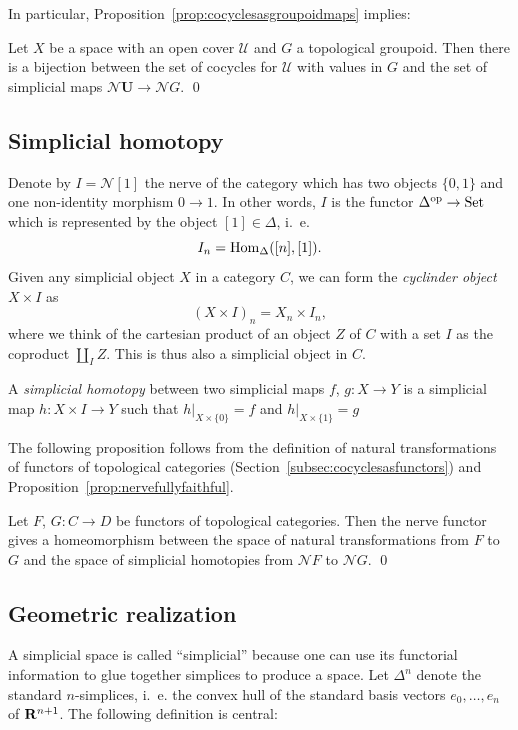 \documentclass[a4paper,openany]{scrbook}
\newcommand{\nerve}{\mathcal N}
\begin{document}
In particular, Proposition~\ref{prop:cocyclesasgroupoidmaps} implies:

\begin{corollary}
Let $X$ be a space with an open cover $\mathcal U$ and $G$ a topological groupoid. Then there is a bijection between the set of cocycles for $\mathcal U$ with values in $G$ and the set of simplicial maps $\nerve \mathbf U \to \nerve G$. \qed
\end{corollary}

\subsection{Simplicial homotopy}

Denote by $I=\nerve [1]$ the nerve of the category which has two objects $\{0,1\}$ and one non-identity morphism $0 \to 1$. In other words, $I$ is the functor $\Delta^{\operatorname{op}}\to\operatorname{Set}$ which is represented by the object $[1] \in \Delta$, i.~e.
\[
I_n = \operatorname{Hom}_{\Delta}([n],[1]).
\]
Given any simplicial object $X$ in a category $C$, we can form the \emph{cyclinder object} $X \times I$ as
\[
(X \times I)_n = X_n \times I_n,
\]
where we think of the cartesian product of an object $Z$ of $C$ with a set $I$ as the coproduct $\coprod_I Z$. This is thus also a simplicial object in $C$.

\begin{defn}
A \emph{simplicial homotopy} between two simplicial maps $f$, $g\colon X \to Y$ is a simplicial map $h\colon X \times I \to Y$ such that $h|_{X \times \{0\}} = f$ and $h|_{X \times \{1\}} = g$
\end{defn}

The following proposition follows from the definition of natural transformations of functors of topological categories (Section~\ref{subsec:cocyclesasfunctors}) and Proposition~\ref{prop:nervefullyfaithful}.

\begin{prop}
Let $F$, $G\colon C \to D$ be functors of topological categories. Then the nerve functor gives a homeomorphism between the space of natural transformations from $F$ to $G$ and the space of simplicial homotopies from $\nerve F$ to $\nerve G$. \qed
\end{prop}

\subsection{Geometric realization}

A simplicial space is called “simplicial” because one can use its functorial information to glue together simplices to produce a space. Let $\Delta^n$ denote the standard $n$-simplices, i.~e. the convex hull of the standard basis vectors $e_0,\dots,e_n$ of $\mathbf R^{n+1}$. The following definition is central:
\end{document}
